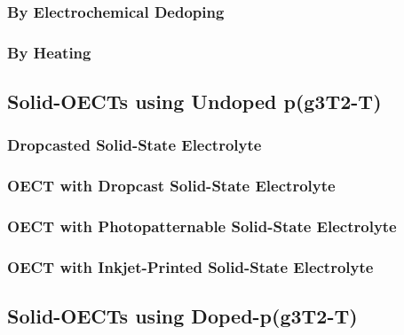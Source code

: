 \subsubsection{By Electrochemical Dedoping}

\subsubsection{By Heating}


\subsection{Solid-OECTs using Undoped p(g3T2-T)}




\subsubsection{Dropcasted Solid-State Electrolyte}

\subsubsection{OECT with Dropcast Solid-State Electrolyte}

\subsubsection{OECT with Photopatternable Solid-State Electrolyte}

\subsubsection{OECT with Inkjet-Printed Solid-State Electrolyte}


\subsection{Solid-OECTs using Doped-p(g3T2-T)}

